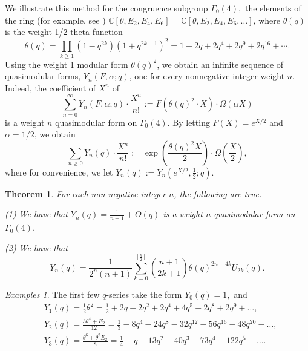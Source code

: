 \documentclass[11pt]{amsart}
\newtheorem{theorem}{Theorem}[section]
\theoremstyle{definition}
\theoremstyle{remark}
\newtheorem*{examples}{Examples}
\numberwithin{equation}{section}
\newcommand{\C}{\mathbb C}
\begin{document}
We illustrate this method for the congruence subgroup $\Gamma_0(4),$ the elements of  the ring (for example, see \cite{Zagier})
 $\C[\theta, E_2, E_4, E_6]=\C[\theta, E_2, E_4, E_6,\dots]$, where $\theta(q)$ is the weight 1/2 theta function
\begin{equation}\label{theta}
 \theta(q) = \prod_{k\geq1}(1-q^{2k})(1+q^{2k-1})^2=1+2q+2q^4+2q^9+2q^{16}+\cdots .
 \end{equation}
Using the weight 1 modular form
$\theta(q)^2$, we obtain an infinite sequence of quasimodular forms, $Y_n(F,\alpha;q)$, one for every nonnegative integer weight $n$. Indeed, the  coefficient of $X^n$ of 
\begin{equation}\label{QuasiModFormula}
\sum_{n=0}^{\infty} Y_n(F,\alpha;q)\cdot \frac{X^n}{n!}:=F(\theta(q)^2\cdot X)\cdot \Omega(\alpha X)
\end{equation}
is a weight $n$ quasimodular form on $\Gamma_0(4).$
By letting $F(X)=e^{X/2}$ and $\alpha=1/2$, we obtain
\begin{equation}
\sum_{n\geq0} Y_n(q)\cdot \frac{X^n}{n!}:=
 \exp\left(\frac{\theta(q)^2 X}{2}\right)\cdot \Omega\left(\frac{X}{2}\right),
\end{equation}
where for convenience, we let $Y_n(q):=Y_n\left (e^{X/2}, \frac{1}{2};q\right).$


\begin{theorem} \label{Omega_coeff} For each non-negative integer $n$, the following are true.

\noindent
(1) We have that ${Y}_n(q)=\frac{1}{n+1}+O(q)$ is a weight $n$ quasimodular form on $\Gamma_0(4)$.

\noindent
(2) We have that
$$  {Y}_n(q) = \frac1{2^n(n+1)} \sum_{k=0}^{\lfloor\frac{n}2\rfloor} \binom{n+1}{2k+1} \theta(q)^{2n-4k} U_{2k}(q).$$

\end{theorem}

\begin{examples} The first few $q$-series take the form $Y_0(q)=1,$ and
\begin{align*}
&{Y}_1(q) = \frac12\theta^2=\frac{1}{2}+2q+2q^2+2q^4+4q^5+2q^8+2q^9+\dots,\\
&{Y}_2(q) = \frac{3\theta^4+E_2}{12}=\frac{1}{3}-8q^4-24q^8-32q^{12}-56q^{16}-48q^{20}-\dots, \\
&{Y}_3(q)= \frac{\theta^6+\theta^2E_2}8 =\frac{1}{4}-q-13q^2-40q^3-73q^4-122q^5-\dots.\\
\end{align*}
\end{examples}
\end{document}
